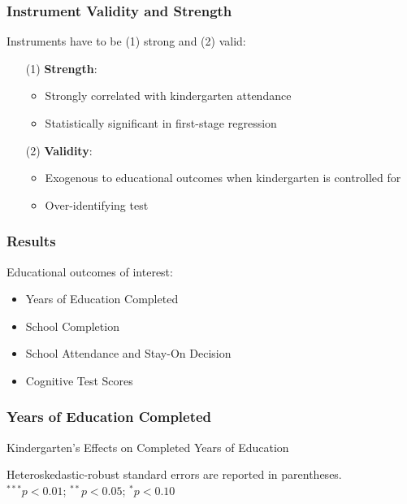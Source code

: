 \documentclass{beamer}
\begin{document}
\begin{frame}
\frametitle{Instrument Validity and Strength}
Instruments have to be (1) strong and (2) valid:
\vspace{0.2in}
\begin{itemize}
	\item[(1)] \textbf{Strength}: 
	\begin{itemize}
		\item Strongly correlated with kindergarten attendance
		\item Statistically significant in first-stage regression
	\end{itemize}
\vspace{0.2in}
	\item[(2)] \textbf{Validity}: 
	\begin{itemize} 
		\item Exogenous to educational outcomes when kindergarten is controlled for 
		\item Over-identifying test
	\end{itemize}
\end{itemize}
\end{frame}

\begin{frame}
\frametitle{Results}
Educational outcomes of interest:
\vspace{0.1in}
\begin{itemize}
	\item Years of Education Completed
	\vspace{0.1in}
	\item School Completion 
	\vspace{0.1in}
	\item School Attendance and Stay-On Decision 
	\vspace{0.1in}
	\item Cognitive Test Scores
\end{itemize}
\end{frame}

\begin{frame}
\frametitle{Years of Education Completed}
\begin{table}
	\caption{Kindergarten's Effects on Completed Years of Education}
	\begin{threeparttable}
		{\tiny}
	\begin{tablenotes}
		\item {\tiny Heteroskedastic-robust standard errors are reported in parentheses. \\ $^{***}p<0.01$; $^{**}p<0.05$; $^{*}p<0.10$}
	\end{tablenotes} 
	\end{threeparttable}
\end{table}
\end{frame}
\end{document}
